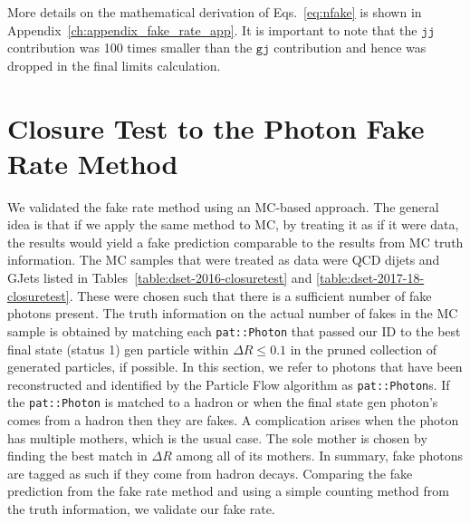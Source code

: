 

More details on the mathematical derivation of Eqs.~\ref{eq:nfake} is shown in Appendix~\ref{ch:appendix_fake_rate_app}. It is important to note that the $\texttt{jj}$ contribution was 100 times smaller than the $\texttt{gj}$ contribution and hence was dropped in the final limits calculation. 

\section{Closure Test to the Photon Fake Rate Method}\label{sec:closure_test}

 We validated the fake rate method using an MC-based approach. The general idea is that if we apply the same method to MC, by treating it as if it were data, the results would yield a fake prediction comparable to the results from MC truth information. The MC samples that were treated as data were QCD dijets and GJets listed in Tables~\ref{table:dset-2016-closuretest} and \ref{table:dset-2017-18-closuretest}. These were chosen such that there is a sufficient number of fake photons present. The truth information on the actual number of fakes in the MC sample is obtained by matching each \texttt{pat::Photon} that passed our ID to the best final state (status 1) gen particle within $\Delta R \leq 0.1$ in the pruned collection of generated particles, if possible. In this section, we refer to photons that have been reconstructed and identified by the Particle Flow algorithm as \texttt{pat::Photon}s. If the \texttt{pat::Photon} is matched to a hadron or when the final state gen photon's comes from a hadron then they are fakes. A complication arises when the photon has multiple mothers, which is the usual case. The sole mother is chosen by finding the best match in $\Delta R$ among all of its mothers. In summary, fake photons are tagged as such if they come from hadron decays. Comparing the fake prediction from the fake rate method and using a simple counting method from the truth information, we validate our fake rate.

